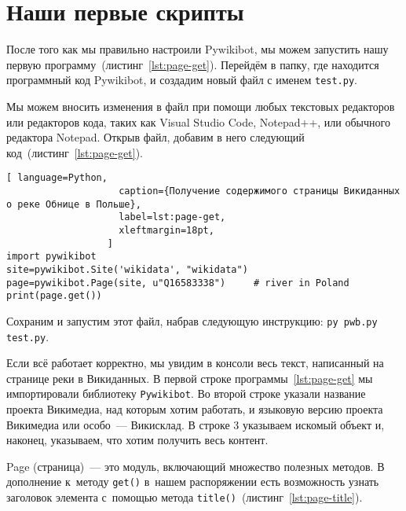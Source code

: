 \section{Наши первые скрипты}

\label{sec:firstScript}
После того как мы правильно настроили Pywikibot, мы можем запустить 
нашу первую программу~(листинг~\ref{lst:page-get}). 
Перейдём в папку, где находится программный код Pywikibot, 
и создадим новый файл с именем \lstinline|test.py|.

Мы можем вносить изменения в файл при помощи любых текстовых редакторов 
или редакторов кода, таких как 
Visual Studio Code, Notepad++, или обычного редактора Notepad. 
Открыв файл, добавим в него следующий код~(листинг~\ref{lst:page-get}).

%
\begin{lstlisting}[ language=Python,
                    caption={Получение содержимого страницы Викиданных о реке Обнице в Польше},
                    label=lst:page-get,
                    xleftmargin=18pt, 
                  ]
import pywikibot
site=pywikibot.Site('wikidata', "wikidata")
page=pywikibot.Page(site, u"Q16583338")     # river in Poland
print(page.get())
\end{lstlisting}

Сохраним и запустим этот файл, набрав следующую инструкцию: \lstinline|py pwb.py test.py|.

Если всё работает корректно, мы увидим в консоли весь текст, 
написанный на странице реки  в Викиданных. 
В первой строке программы~\ref{lst:page-get} мы импортировали библиотеку \lstinline|Pywikibot|. 
Во второй строке указали название проекта Викимедиа, над которым хотим работать, 
и языковую версию проекта Викимедиа или особо~--- Викисклад. 
%
В строке 3 указываем искомый объект и, наконец, указываем, что хотим получить весь контент.


Page (страница)~--- это модуль, включающий множество полезных методов. 
%
В дополнение к~методу \lstinline|get()| в~нашем распоряжении есть возможность 
узнать заголовок элемента с~помощью метода \lstinline|title()|~(листинг~\ref{lst:page-title}).

